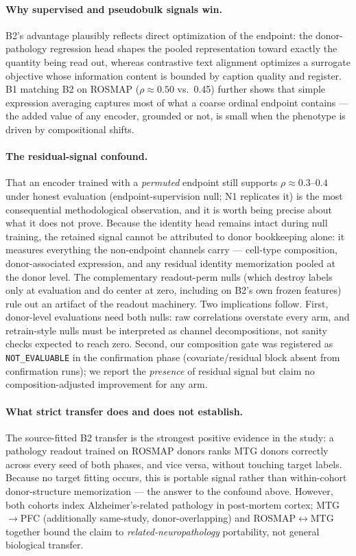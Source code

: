 \documentclass[11pt]{article}
\begin{document}
\paragraph{Why supervised and pseudobulk signals win.}
B2's advantage plausibly reflects direct optimization of the endpoint:
the donor-pathology regression head shapes the pooled representation
toward exactly the quantity being read out, whereas contrastive text
alignment optimizes a surrogate objective whose information content is
bounded by caption quality and register. B1 matching B2 on ROSMAP
($\rho\approx0.50$ vs.\ 0.45) further shows that simple expression
averaging captures most of what a coarse ordinal endpoint contains ---
the added value of any encoder, grounded or not, is small when the
phenotype is driven by compositional shifts.

\paragraph{The residual-signal confound.}
That an encoder trained with a \emph{permuted} endpoint still supports
$\rho\approx0.3$--$0.4$ under honest evaluation (endpoint-supervision
null; N1 replicates it) is the most consequential methodological
observation, and it is worth being precise about what it does not
prove. Because the identity head remains intact during null training,
the retained signal cannot be attributed to donor bookkeeping alone:
it measures everything the non-endpoint channels carry --- cell-type
composition, donor-associated expression, and any residual identity
memorization pooled at the donor level. The complementary readout-perm
nulls (which destroy labels only at evaluation and do center at zero,
including on B2's own frozen features) rule out an artifact of the
readout machinery. Two implications follow. First, donor-level
evaluations need both nulls: raw correlations overstate every arm, and
retrain-style nulls must be interpreted as channel decompositions, not
sanity checks expected to reach zero. Second, our composition gate was
registered as \texttt{NOT\_EVALUABLE} in the confirmation phase
(covariate/residual block absent from confirmation runs); we report the
\emph{presence} of residual signal but claim no composition-adjusted
improvement for any arm.

\paragraph{What strict transfer does and does not establish.}
The source-fitted B2 transfer is the strongest positive evidence in the
study: a pathology readout trained on ROSMAP donors ranks MTG donors
correctly across every seed of both phases, and vice versa, without
touching target labels. Because no target fitting occurs, this is
portable signal rather than within-cohort donor-structure memorization
--- the answer to the confound above. However, both cohorts index
Alzheimer's-related pathology in post-mortem cortex; MTG$\to$PFC
(additionally same-study, donor-overlapping) and
ROSMAP$\leftrightarrow$MTG together bound the claim to
\emph{related-neuropathology} portability, not general biological
transfer.
\end{document}
